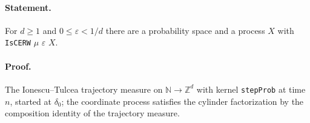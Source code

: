 \paragraph{Statement.} For $d\geq1$ and $0\leq\varepsilon<1/d$ there are a probability space and a process $X$ with \texttt{IsCERW} $\mu$ $\varepsilon$ $X$.
\paragraph{Proof.} The Ionescu--Tulcea trajectory measure on $\mathbb N\to\mathbb Z^d$ with kernel \texttt{stepProb} at time $n$, started at $\delta_0$; the coordinate process satisfies the cylinder factorization by the composition identity of the trajectory measure.
